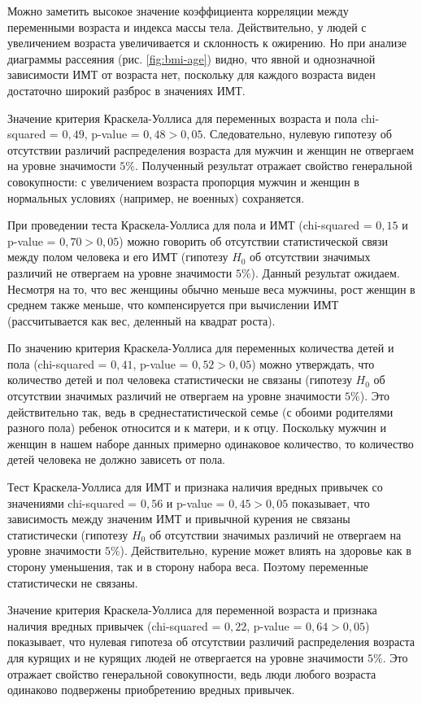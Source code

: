 \documentclass[a4paper,12pt]{article}
\begin{document}
Можно заметить высокое значение коэффициента корреляции между переменными возраста и индекса массы тела. Действительно, у людей с увеличением возраста увеличивается и склонность к ожирению. Но при анализе диаграммы рассеяния (рис. \ref{fig:bmi-age}) видно, что явной и однозначной зависимости ИМТ от возраста нет, поскольку для каждого возраста виден достаточно широкий разброс в значениях ИМТ.
	
Значение критерия Краскела-Уоллиса для переменных возраста и пола chi-squared = $0,49$, p-value = $0,48 > 0,05$. Следовательно, нулевую гипотезу об отсутствии различий распределения возраста для мужчин и женщин не отвергаем на уровне значимости $5\%$. Полученный результат отражает свойство генеральной совокупности: с увеличением возраста пропорция мужчин и женщин в нормальных условиях (например, не военных) сохраняется. 

При проведении теста Краскела-Уоллиса для пола и ИМТ (chi-squared = $0,15$ и p-value = $0,70 > 0,05$) можно говорить об отсутствии статистической связи между полом человека и его ИМТ (гипотезу $H_0$ об отсутствии значимых различий не отвергаем на уровне значимости $5\%$). Данный результат ожидаем. Несмотря на то, что вес женщины обычно меньше веса мужчины, рост женщин в среднем также меньше, что компенсируется при вычислении ИМТ (рассчитывается как вес, деленный на квадрат роста).

По значению критерия Краскела-Уоллиса для переменных количества детей и пола (chi-squared = $0,41$,  p-value = $0,52 > 0,05$) можно утверждать, что количество детей и пол человека статистически не связаны (гипотезу $H_0$ об отсутствии значимых различий не отвергаем на уровне значимости $5\%$). Это действительно так, ведь в среднестатистической семье (с обоими родителями разного пола) ребенок относится и к матери, и к отцу. Поскольку мужчин и женщин в нашем наборе данных примерно одинаковое количество, то количество детей человека не должно зависеть от пола.

Тест Краскела-Уоллиса для ИМТ и признака наличия вредных привычек со значениями chi-squared = $0,56$ и p-value = $0,45 > 0,05$ показывает, что зависимость между значеним ИМТ и привычной курения не связаны статистически (гипотезу $H_0$ об отсутствии значимых различий не отвергаем на уровне значимости $5\%$). Действительно, курение может влиять на здоровье как в сторону уменьшения, так и в сторону набора веса. Поэтому переменные статистически не связаны.

Значение критерия Краскела-Уоллиса для переменной возраста и признака наличия вредных привычек (chi-squared = $0,22$, p-value = $0,64 > 0,05$) показывает, что нулевая гипотеза об отсутствии различий распределения возраста для курящих и не курящих людей не отвергается на уровне значимости $5\%$. Это отражает свойство генеральной совокупности, ведь люди любого возраста одинаково подвержены приобретению вредных привычек.
\end{document}
